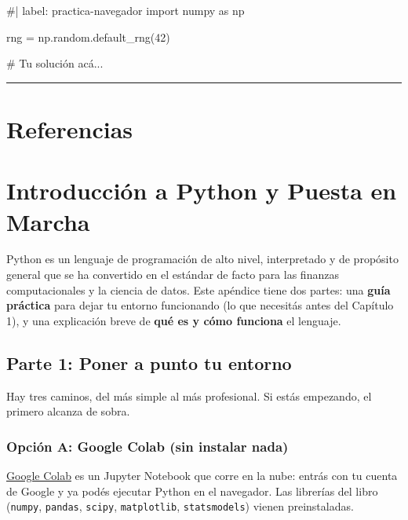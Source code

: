 \documentclass[
  spanish,
  letterpaper,
  DIV=11,
  numbers=noendperiod]{scrreprt}
\newenvironment{Shaded}{\begin{snugshade}}{\end{snugshade}}
\newcommand{\NormalTok}[1]{\textcolor[rgb]{0.00,0.23,0.31}{#1}}
\begin{document}
\begin{Shaded}
\begin{Highlighting}[]
\NormalTok{\#| label: practica{-}navegador}
\NormalTok{import numpy as np}

\NormalTok{rng = np.random.default\_rng(42)}

\NormalTok{\# Tu solución acá...}
\end{Highlighting}
\end{Shaded}

\begin{center}\rule{0.5\linewidth}{0.5pt}\end{center}

\chapter{Referencias}\label{referencias-19}

\label{refs}

\cleardoublepage
{}
{}
\appendix

\chapter{Introducción a Python y Puesta en
Marcha}\label{sec-python-intro}

Python es un lenguaje de programación de alto nivel, interpretado y de
propósito general que se ha convertido en el estándar de facto para las
finanzas computacionales y la ciencia de datos. Este apéndice tiene dos
partes: una \textbf{guía práctica} para dejar tu entorno funcionando (lo
que necesitás antes del Capítulo 1), y una explicación breve de
\textbf{qué es y cómo funciona} el lenguaje.

\section{Parte 1: Poner a punto tu
entorno}\label{parte-1-poner-a-punto-tu-entorno}

Hay tres caminos, del más simple al más profesional. Si estás empezando,
el primero alcanza de sobra.

\subsection{Opción A: Google Colab (sin instalar
nada)}\label{opciuxf3n-a-google-colab-sin-instalar-nada}

\href{https://colab.research.google.com}{Google Colab} es un Jupyter
Notebook que corre en la nube: entrás con tu cuenta de Google y ya podés
ejecutar Python en el navegador. Las librerías del libro
(\texttt{numpy}, \texttt{pandas}, \texttt{scipy}, \texttt{matplotlib},
\texttt{statsmodels}) vienen preinstaladas.
\end{document}

